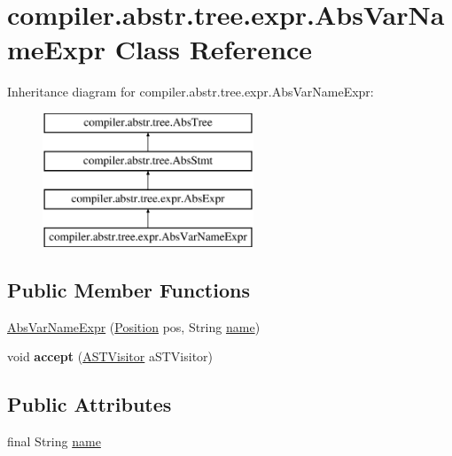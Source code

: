 \hypertarget{classcompiler_1_1abstr_1_1tree_1_1expr_1_1_abs_var_name_expr}{}\section{compiler.\+abstr.\+tree.\+expr.\+Abs\+Var\+Name\+Expr Class Reference}
\label{classcompiler_1_1abstr_1_1tree_1_1expr_1_1_abs_var_name_expr}
Inheritance diagram for compiler.\+abstr.\+tree.\+expr.\+Abs\+Var\+Name\+Expr\+:\begin{figure}[H]
\begin{center}
\leavevmode
\includegraphics[height=4.000000cm]{classcompiler_1_1abstr_1_1tree_1_1expr_1_1_abs_var_name_expr}
\end{center}
\end{figure}
\subsection*{Public Member Functions}
\begin{DoxyCompactItemize}
\item 
\hyperlink{classcompiler_1_1abstr_1_1tree_1_1expr_1_1_abs_var_name_expr_a9ce8d88663c547e8fd70cd8866fedb8f}{Abs\+Var\+Name\+Expr} (\hyperlink{classcompiler_1_1_position}{Position} pos, String \hyperlink{classcompiler_1_1abstr_1_1tree_1_1expr_1_1_abs_var_name_expr_a084cd7f73703043ca7a14159dc266859}{name})
\item 
\mbox{\label{classcompiler_1_1abstr_1_1tree_1_1expr_1_1_abs_var_name_expr_ac2a4b065bcd82cc0f4f12fd728d3a970}} 
void {\bfseries accept} (\hyperlink{interfacecompiler_1_1abstr_1_1_a_s_t_visitor}{A\+S\+T\+Visitor} a\+S\+T\+Visitor)
\end{DoxyCompactItemize}
\subsection*{Public Attributes}
\begin{DoxyCompactItemize}
\item 
final String \hyperlink{classcompiler_1_1abstr_1_1tree_1_1expr_1_1_abs_var_name_expr_a084cd7f73703043ca7a14159dc266859}{name}
\end{DoxyCompactItemize}


